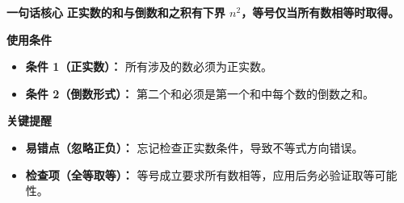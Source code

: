 \begin{summarybox}
\textbf{\textcolor{CSummary}{一句话核心}}
\textbf{正实数的和与倒数和之积有下界 $n^2$，等号仅当所有数相等时取得。}

\medskip
\textbf{\textcolor{CSummary}{使用条件}}
\begin{itemize}[leftmargin=*, itemsep=0.5em, topsep=0.4em]
    \item \textbf{条件 1（正实数）：} 所有涉及的数必须为正实数。
    \item \textbf{条件 2（倒数形式）：} 第二个和必须是第一个和中每个数的倒数之和。
\end{itemize}

\medskip
\textbf{\textcolor{CSummary}{关键提醒}}
\begin{itemize}[leftmargin=*, itemsep=0.5em, topsep=0.4em]
    \item \textbf{易错点（忽略正负）：} 忘记检查正实数条件，导致不等式方向错误。
    \item \textbf{检查项（全等取等）：} 等号成立要求所有数相等，应用后务必验证取等可能性。
\end{itemize}
\end{summarybox}
